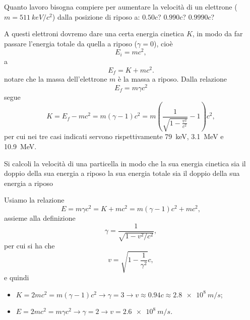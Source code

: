 
\begin{Exercise}[title={Energia cinetica}]
Quanto lavoro bisogna compiere per aumentare la velocità di un elettrone ($m=\SI{511}{keV/c^2}$) dalla posizione di riposo a:
\Question $0.50c$?
\Question $0.990c$?
\Question $0.9990c$?
\end{Exercise}
\begin{Answer}
A questi elettroni dovremo dare una certa energia cinetica $K$, in modo da far passare l'energia totale da quella a riposo ($\gamma=0$), cio\`e
\begin{equation*}
    E_i = mc^2,
\end{equation*}
a
\begin{equation*}
    E_f = K + mc^2. 
\end{equation*}
notare che la massa dell'elettrone $m$ \`e la massa a riposo.
Dalla relazione
\begin{equation*}
    E_f = m\gamma c^2
\end{equation*}
segue
\begin{equation*}
    K = E_f - mc^2 = m(\gamma - 1) c^2 = m\left(\frac{1}{\sqrt{1-\frac{v^2}{c^2}}}-1\right)c^2,
\end{equation*}
per cui nei tre casi indicati servono rispettivamente \SI{79}{keV}, \SI{3.1}{MeV} e \SI{10.9}{MeV}.
\end{Answer}


\begin{Exercise}[title={Energia cinetica}]
Si calcoli la velocità di una particella in modo che
\Question la sua energia cinetica sia il doppio della sua energia a riposo
\Question la sua energia totale sia il doppio della sua energia a riposo
\end{Exercise}
\begin{Answer}
Usiamo la relazione
\begin{equation*}
    E = m\gamma c^2 = K+mc^2 = m(\gamma -1)c^2 + mc^2,
\end{equation*}
assieme alla definizione
\begin{equation*}
    \gamma=\frac{1}{\sqrt{1-v^2/c^2}},
\end{equation*}
per cui si ha che
\begin{equation*}
    v = \sqrt{1-\frac{1}{\gamma^2}}c,
\end{equation*}
e quindi
\begin{itemize}
    \item $K=2mc^2 = m(\gamma-1) c^2\rightarrow \gamma = 3 \rightarrow v \approx  0.94c \approx \SI{2.8e8}{m/s}$;

    \item $E=2mc^2=m\gamma c^2\rightarrow \gamma = 2\rightarrow v = \SI{2.6e8}{m/s}$.
\end{itemize}
\end{Answer}


